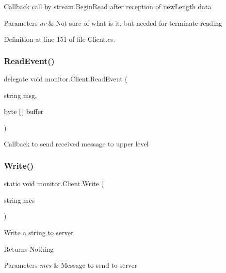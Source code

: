 Callback call by stream.\+Begin\+Read after reception of new\+Length data 


\begin{DoxyParams}{Parameters}
{\em ar} & Not sure of what is it, but needed for terminate reading\\
\hline
\end{DoxyParams}


Definition at line 151 of file Client.\+cs.

\mbox{\label{classmonitor_1_1_client_ae85f4aa567a41488d5c65e470ae15378}} 
\subsubsection{Read\+Event()}
{\footnotesize\ttfamily delegate void monitor.\+Client.\+Read\+Event (\begin{DoxyParamCaption}\item[{string}]{msg,  }\item[{byte [$\,$]}]{buffer }\end{DoxyParamCaption})}



Callback to send received message to upper level 

\mbox{\label{classmonitor_1_1_client_a081413295e7a96662b39b2ddec854b02}} 
\subsubsection{Write()}
{\footnotesize\ttfamily static void monitor.\+Client.\+Write (\begin{DoxyParamCaption}\item[{string}]{mes }\end{DoxyParamCaption})\hspace{0.3cm}{\ttfamily [static]}}



Write a string to server 

\begin{DoxyReturn}{Returns}
Nothing
\end{DoxyReturn}

\begin{DoxyParams}{Parameters}
{\em mes} & Message to send to server\\
\hline
\end{DoxyParams}


